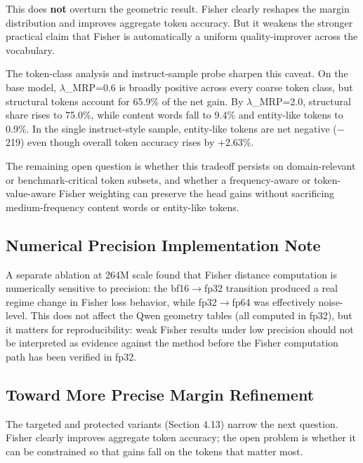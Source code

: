 \documentclass[
  11pt,
]{article}
\begin{document}
This does \textbf{not} overturn the geometric result. Fisher clearly
reshapes the margin distribution and improves aggregate token accuracy.
But it weakens the stronger practical claim that Fisher is automatically
a uniform quality-improver across the vocabulary.

The token-class analysis and instruct-sample probe sharpen this caveat.
On the base model, $\lambda$\_MRP=0.6 is broadly positive across every coarse
token class, but structural tokens account for 65.9\% of the net gain.
By $\lambda$\_MRP=2.0, structural share rises to 75.0\%, while content words
fall to 9.4\% and entity-like tokens to 0.9\%. In the single
instruct-style sample, entity-like tokens are net negative ($-$219) even
though overall token accuracy rises by +2.63\%.

The remaining open question is whether this tradeoff persists on
domain-relevant or benchmark-critical token subsets, and whether a
frequency-aware or token-value-aware Fisher weighting can preserve the
head gains without sacrificing medium-frequency content words or
entity-like tokens.

\hypertarget{numerical-precision-implementation-note}{%
\subsection{Numerical Precision Implementation
Note}\label{numerical-precision-implementation-note}}

A separate ablation at 264M scale found that Fisher distance computation
is numerically sensitive to precision: the bf16$\rightarrow$fp32 transition produced
a real regime change in Fisher loss behavior, while fp32$\rightarrow$fp64 was
effectively noise-level. This does not affect the Qwen geometry tables
(all computed in fp32), but it matters for reproducibility: weak Fisher
results under low precision should not be interpreted as evidence
against the method before the Fisher computation path has been verified
in fp32.

\hypertarget{toward-more-precise-margin-refinement}{%
\subsection{Toward More Precise Margin
Refinement}\label{toward-more-precise-margin-refinement}}

The targeted and protected variants (Section 4.13) narrow the next
question. Fisher clearly improves aggregate token accuracy; the open
problem is whether it can be constrained so that gains fall on the
tokens that matter most.
\end{document}
